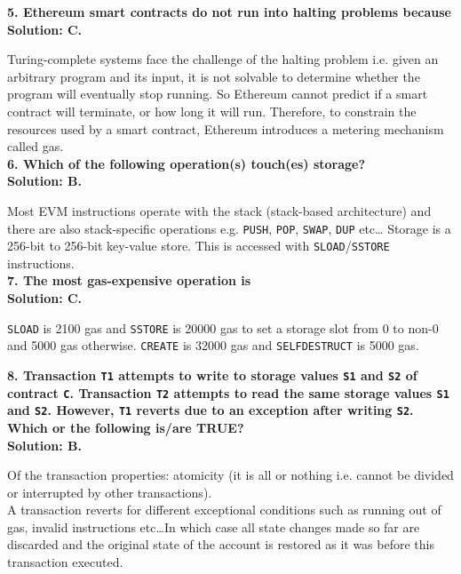 \textbf{5. Ethereum smart contracts do not run into halting problems because}\label{sec:exam1_q5}\\

\textbf{Solution: C.}

Turing-complete systems face the challenge of the halting problem i.e. given an arbitrary program and its input, it is not solvable to determine whether the program will eventually stop running.
So Ethereum cannot predict if a smart contract will terminate, or how long it will run.
Therefore, to constrain the resources used by a smart contract, Ethereum introduces a metering mechanism called gas.\\

\textbf{6. Which of the following operation(s) touch(es) storage?}\label{sec:exam1_q6}\\

\textbf{Solution: B.}

Most EVM instructions operate with the stack (stack-based architecture) and there are also stack-specific operations e.g. \verb|PUSH|, \verb|POP|, \verb|SWAP|, \verb|DUP| etc\dots
Storage is a 256-bit to 256-bit key-value store.
This is accessed with \verb|SLOAD|/\verb|SSTORE| instructions.\\

\textbf{7. The most gas-expensive operation is}\label{sec:exam1_q7}\\

\textbf{Solution: C.}

\verb|SLOAD| is 2100 gas and \verb|SSTORE| is 20000 gas to set a storage slot from 0 to non-0 and 5000 gas otherwise.
\verb|CREATE| is 32000 gas and \verb|SELFDESTRUCT| is 5000 gas.\\

\pagebreak

\textbf{8. Transaction \texttt{T1} attempts to write to storage values \texttt{S1} and \texttt{S2} of contract \texttt{C}.
Transaction \texttt{T2} attempts to read the same storage values \texttt{S1} and \texttt{S2}.
However, \texttt{T1} reverts due to an exception after writing \texttt{S2}. Which or the following is/are TRUE?}\label{sec:exam1_q8}\\

\textbf{Solution: B.}

Of the transaction properties: atomicity (it is all or nothing i.e. cannot be divided or interrupted by other transactions).\\

A transaction reverts for different exceptional conditions such as running out of gas, invalid instructions etc\dots In which case all state changes made so far are discarded and the original state of the account is restored as it was before this transaction executed.\\

